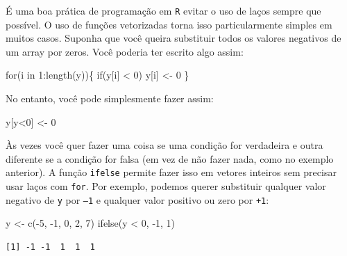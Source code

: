 \documentclass[
  letterpaper,
  DIV=11,
  numbers=noendperiod]{scrreprt}
\newenvironment{Shaded}{\begin{snugshade}}{\end{snugshade}}
\newcommand{\ControlFlowTok}[1]{\textcolor[rgb]{0.00,0.23,0.31}{#1}}
\newcommand{\DecValTok}[1]{\textcolor[rgb]{0.68,0.00,0.00}{#1}}
\newcommand{\FunctionTok}[1]{\textcolor[rgb]{0.28,0.35,0.67}{#1}}
\newcommand{\NormalTok}[1]{\textcolor[rgb]{0.00,0.23,0.31}{#1}}
\newcommand{\OtherTok}[1]{\textcolor[rgb]{0.00,0.23,0.31}{#1}}
\newcommand{\SpecialCharTok}[1]{\textcolor[rgb]{0.37,0.37,0.37}{#1}}
\begin{document}
É uma boa prática de programação em \texttt{R} evitar o uso de laços
sempre que possível. O uso de funções vetorizadas torna isso
particularmente simples em muitos casos. Suponha que você queira
substituir todos os valores negativos de um array por zeros. Você
poderia ter escrito algo assim:

\begin{Shaded}
\begin{Highlighting}[]
\ControlFlowTok{for}\NormalTok{(i }\ControlFlowTok{in} \DecValTok{1}\SpecialCharTok{:}\FunctionTok{length}\NormalTok{(y))\{}
  \ControlFlowTok{if}\NormalTok{(y[i] }\SpecialCharTok{\textless{}} \DecValTok{0}\NormalTok{) y[i] }\OtherTok{\textless{}{-}} \DecValTok{0}
\NormalTok{\}}
\end{Highlighting}
\end{Shaded}

No entanto, você pode simplesmente fazer assim:

\begin{Shaded}
\begin{Highlighting}[]
\NormalTok{y[y}\SpecialCharTok{\textless{}}\DecValTok{0}\NormalTok{] }\OtherTok{\textless{}{-}} \DecValTok{0}
\end{Highlighting}
\end{Shaded}

Às vezes você quer fazer uma coisa se uma condição for verdadeira e
outra diferente se a condição for falsa (em vez de não fazer nada, como
no exemplo anterior). A função \texttt{ifelse} permite fazer isso em
vetores inteiros sem precisar usar laços com \texttt{for}. Por exemplo,
podemos querer substituir qualquer valor negativo de \texttt{y} por
\texttt{–1} e qualquer valor positivo ou zero por \texttt{+1}:

\begin{Shaded}
\begin{Highlighting}[]
\NormalTok{y }\OtherTok{\textless{}{-}} \FunctionTok{c}\NormalTok{(}\SpecialCharTok{{-}}\DecValTok{5}\NormalTok{, }\SpecialCharTok{{-}}\DecValTok{1}\NormalTok{, }\DecValTok{0}\NormalTok{, }\DecValTok{2}\NormalTok{, }\DecValTok{7}\NormalTok{)}
\FunctionTok{ifelse}\NormalTok{(y }\SpecialCharTok{\textless{}} \DecValTok{0}\NormalTok{, }\SpecialCharTok{{-}}\DecValTok{1}\NormalTok{, }\DecValTok{1}\NormalTok{)}
\end{Highlighting}
\end{Shaded}

\begin{verbatim}
[1] -1 -1  1  1  1
\end{verbatim}
\end{document}
